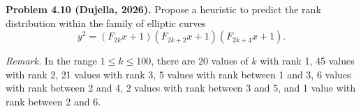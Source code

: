 \textbf{Problem 4.10 (Dujella, 2026).} Propose a heuristic to predict the rank distribution within the family of elliptic curves
\[
y^2=(F_{2k}x+1)(F_{2k+2}x+1)(F_{2k+4}x+1).
\]

\medskip

\textit{Remark.} In the range $1 \leqslant k \leqslant 100$, there are 20 values of $k$ with rank 1, 45 values with rank 2, 21 values with rank 3, 5 values with rank between 1 and 3, 6 values with rank between 2 and 4, 2 values with rank between 3 and 5, and 1 value with rank between 2 and 6.
